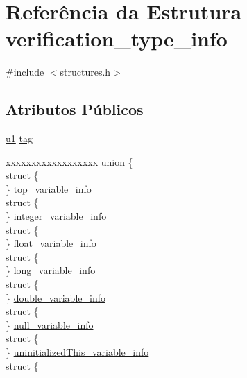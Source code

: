 \hypertarget{structverification__type__info}{}\section{Referência da Estrutura verification\+\_\+type\+\_\+info}
\label{structverification__type__info}


{\ttfamily \#include $<$structures.\+h$>$}

\subsection*{Atributos Públicos}
\begin{DoxyCompactItemize}
\item 
\hyperlink{lista__operandos_8h_ad9f4cdb6757615aae2fad89dab3c5470}{u1} \hyperlink{structverification__type__info_aeb9c72b398b4d3ce0863a916f973b05c}{tag}
\item 
\begin{tabbing}
xx\=xx\=xx\=xx\=xx\=xx\=xx\=xx\=xx\=\kill
union \{\\
\>struct \{\\
\>\} \hyperlink{structverification__type__info_ae8a25f3b3f2824a904c772ecbbd249e1}{top\_variable\_info}\\
\>struct \{\\
\>\} \hyperlink{structverification__type__info_a518dcb2dd60e556d8ea4059f6a6dd3b1}{integer\_variable\_info}\\
\>struct \{\\
\>\} \hyperlink{structverification__type__info_a21e1445357184dfacb843c0e9d75c5a3}{float\_variable\_info}\\
\>struct \{\\
\>\} \hyperlink{structverification__type__info_ae205fc70c729fd4a92d31af0becd819d}{long\_variable\_info}\\
\>struct \{\\
\>\} \hyperlink{structverification__type__info_a0198e2c34f8ffc66cbfe8adf0ab20170}{double\_variable\_info}\\
\>struct \{\\
\>\} \hyperlink{structverification__type__info_a42ba92ebe27d42af296a395c54fa10ad}{null\_variable\_info}\\
\>struct \{\\
\>\} \hyperlink{structverification__type__info_a8b83ff57fc01ffdd4f7761af5ab72885}{uninitializedThis\_variable\_info}\\
\>struct \{\\

\end{tabbing}
\end{DoxyCompactItemize}
